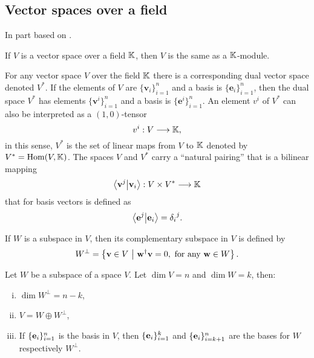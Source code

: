 \subsection{Vector spaces over a field}

In part based on \cite{Jeevanjee}.

\begin{remark}[Modules]
	If $V$ is a vector space over a field $\mathbb{K}$, then $V$ is the same as a $\mathbb{K}$-module.
\end{remark}

\begin{definition}
	For any vector space $V$ over the field $\mathbb{K}$ there is a corresponding dual vector space denoted $V^*$. If the elements of $V$ are $\{\mathbf{v}_i\}_{i=1}^n$ and a basis is $\{\mathbf{e}_i\}_{i=1}^n$, then the dual space $V^*$ has elements $\{\mathbf{v}^i\}_{i=1}^n$ and a basis is $\{\mathbf{e}^i\}_{i=1}^n$. An element $v^i$ of $V^*$ can also be interpreted as a $(1,0)$-tensor
	\[
	v^i: V \longrightarrow \mathbb{K},
	\]
	in this sense, $V^*$ is the set of linear maps from $V$ to $\mathbb{K}$ denoted by $V^* = \text{Hom}(V,\mathbb{K})$.
	The spaces $V$ and $V^*$ carry a ``natural pairing'' that is a bilinear mapping
	\[
	\bra{\mathbf{v}^j}\ket{\mathbf{v}_i}: V \times V^* \longrightarrow \mathbb{K}
	\]
	that for basis vectors is defined as
	\[
	\bra{\mathbf{e}^j}\ket{\mathbf{e}_i} = {\delta_i}^j.
	\]
\end{definition}

\begin{definition}\label{def:orthsubspace}
	\cite[12.7]{holst} If $W$ is a subspace in $V$, then its complementary subspace in $V$ is defined by 
	\[
	W^\perp = \left\lbrace \mathbf{v} \in V \ \middle\vert \ \mathbf{w}^\dagger \mathbf{v} = 0, \text{ for any } \mathbf{w} \in W \right\rbrace.
	\]
\end{definition}

\begin{lemma}\label{lemma:compsubspace}\cite[Thm 12.16]{holst}
	Let $W$ be a subspace of a space $V$. Let $\dim V = n$ and $\dim W = k$, then:
	\noindent
	\begin{enumerate}[i)]
		\setlength\itemsep{-0.5em}
		\item $\dim W^\perp = n - k$,
		\item $V = W \oplus W^\perp$,
		\item If $\{\mathbf{e}_i\}_{i=1}^{n}$ is the basis in $V$, then $\{\mathbf{e}_i\}_{i=1}^{k}$ and $\{\mathbf{e}_i\}_{i=k+1}^{n}$ are the bases for $W$ respectively $W^\perp$.
	\end{enumerate}
\end{lemma}

